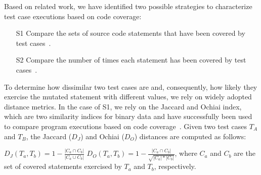 Based on related work, we have identified two possible strategies to characterize test case executions based on code coverage:
\begin{itemize}
\item[S1] Compare the sets of source code statements that have been covered by test cases~\cite{grun2009impact}.
\item[S2] Compare the number of times each statement has been covered by test cases~\cite{schuler2013covering}.
\end{itemize}


To determine how dissimilar two test cases are and, consequently, how likely they exercise the mutated statement with different values, we rely on widely adopted distance metrics.
In the case of S1, we rely on the Jaccard and Ochiai index, which are two similarity indices for binary data and have successfully been used to compare program executions based on code coverage~\cite{Zou:Ochiai:2019,Keller:Jaccard:2017,Briand:2019}.
Given two test cases $T_A$ and $T_B$, the Jaccard  ($D_J$) and Ochiai ($D_O$) distances are computed as follows:

$D_J(T_a,T_b)=1-\frac{|C_a \cap C_b|}{|C_a \cup C_b|}$ \hspace{2mm} $D_O(T_a,T_b)=1-\frac{|C_a \cap C_b|}{\sqrt{|C_a| * |C_b|}}$,
where $C_a$ and $C_b$ are the set of covered statements exercised by $T_a$ and $T_b$, respectively.

